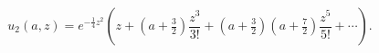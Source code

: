 \[u_{2}(a,z)=e^{-\tfrac{1}{4}z^{2}}\left(z+(a+\tfrac{3}{2})\frac{z^{3}}{3!}+(a+%
\tfrac{3}{2})(a+\tfrac{7}{2})\frac{z^{5}}{5!}+\cdots\right).\]